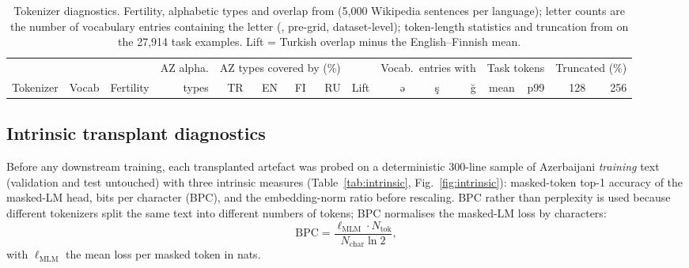 \begin{table}[!t]
\caption{Tokenizer diagnostics. Fertility, alphabetic types and overlap from  (5{,}000 Wikipedia sentences per language); letter counts are the number of vocabulary entries containing the letter (, pre-grid, dataset-level); token-length statistics and truncation from  on the 27{,}914 task examples. Lift = Turkish overlap minus the English–Finnish mean.}
\label{tab:tokenizer}
\centering
\footnotesize
\begin{tabular}{@{}lrrrrrrrrrrrrrrr@{}}
\toprule
 & & & AZ alpha. & \multicolumn{4}{c}{AZ types covered by (\%)} & & \multicolumn{3}{c}{Vocab.\ entries with} & \multicolumn{2}{c}{Task tokens} & \multicolumn{2}{c}{Truncated (\%)} \\
\cmidrule(lr){5-8}\cmidrule(lr){10-12}\cmidrule(lr){13-14}\cmidrule(lr){15-16}
Tokenizer & Vocab & Fertility & types & TR & EN & FI & RU & Lift & ə & ş & ğ & mean & p99 & 128 & 256 \\
\midrule

\end{tabular}
\end{table}

\subsection{Intrinsic transplant diagnostics}
\label{sec:res:intrinsic}
Before any downstream training, each transplanted artefact was probed on a deterministic 300-line sample of Azerbaijani \emph{training} text (validation and test untouched) with three intrinsic measures (Table~\ref{tab:intrinsic}, Fig.~\ref{fig:intrinsic}): masked-token top-1 accuracy of the masked-LM head, bits per character (BPC), and the embedding-norm ratio before rescaling. BPC rather than perplexity is used because different tokenizers split the same text into different numbers of tokens; BPC normalises the masked-LM loss by characters:
\begin{equation}
\mathrm{BPC}=\frac{\ell_{\mathrm{MLM}}\cdot N_{\mathrm{tok}}}{N_{\mathrm{char}}\ln 2},
\label{eq:bpc}
\end{equation}
with $\ell_{\mathrm{MLM}}$ the mean loss per masked token in nats.

